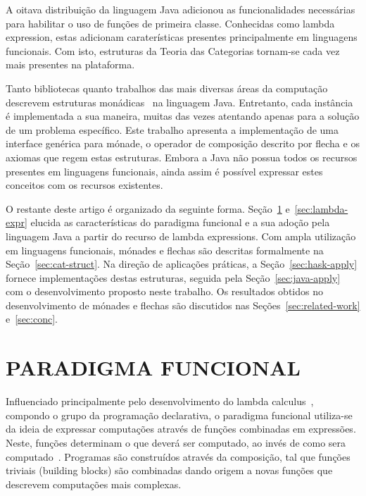 \documentclass[10pt, conference]{IEEEtran}
\begin{document}
A oitava distribuição da linguagem Java adicionou as funcionalidades necessárias para habilitar o uso de funções de primeira classe. Conhecidas como lambda expression, estas adicionam caraterísticas presentes principalmente em linguagens funcionais. Com isto, estruturas da Teoria das Categorias tornam-se cada vez mais presentes na plataforma.

Tanto bibliotecas quanto trabalhos das mais diversas áreas da computação descrevem estruturas monádicas~\cite{crestani2013quantum, dubois2009domainspecific, urma2014java} na linguagem Java. Entretanto, cada instância é implementada a sua maneira, muitas das vezes atentando apenas para a solução de um problema específico. Este trabalho apresenta a implementação de uma interface genérica para mónade, o operador de composição descrito por flecha e os axiomas que regem estas estruturas. Embora a Java não possua todos os recursos presentes em linguagens funcionais, ainda assim é possível expressar estes conceitos com os recursos existentes.

O restante deste artigo é organizado da seguinte forma. Seção~\ref{sec:func-para} e~\ref{sec:lambda-expr} elucida as características do paradigma funcional e a sua adoção pela linguagem Java a partir do recurso de lambda expressions. Com ampla utilização em linguagens funcionais, mónades e flechas são descritas formalmente na Seção~\ref{sec:cat-struct}. Na direção de aplicações práticas, a Seção~\ref{sec:hask-apply} fornece implementações destas estruturas, seguida pela Seção~\ref{sec:java-apply} com o desenvolvimento proposto neste trabalho. Os resultados obtidos no desenvolvimento de mónades e flechas são discutidos nas Seções~\ref{sec:related-work} e~\ref{sec:conc}.

\section{PARADIGMA FUNCIONAL}
\label{sec:func-para}

Influenciado principalmente pelo desenvolvimento do lambda calculus~\cite{hudak1989conception}, compondo o grupo da programação declarativa, o paradigma funcional utiliza-se da ideia de expressar computações através de funções combinadas em expressões. Neste, funções determinam o que deverá ser computado, ao invés de como sera computado~\cite{louden2011programming}. Programas são construídos através da composição, tal que funções triviais (building blocks) são combinadas dando origem a novas funções que descrevem computações mais complexas.
\end{document}
